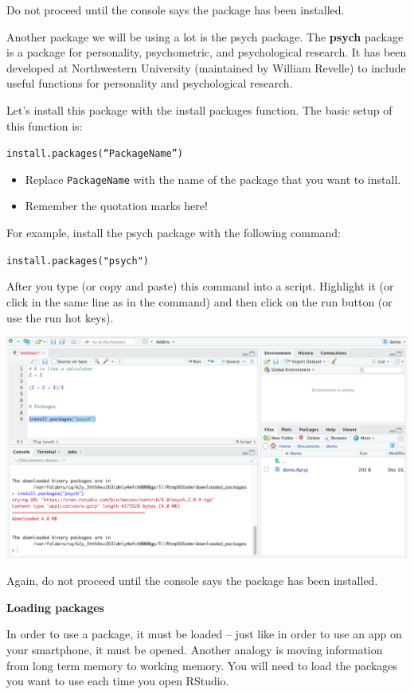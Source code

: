 \documentclass[
]{book}
\providecommand{\tightlist}{%
  \setlength{\itemsep}{0pt}\setlength{\parskip}{0pt}}
\begin{document}
Do not proceed until the console says the package has been installed.

Another package we will be using a lot is the psych package. The \textbf{psych} package is a package for personality, psychometric, and psychological research. It has been developed at Northwestern University (maintained by William Revelle) to include useful functions for personality and psychological research.

Let's install this package with the install packages function. The basic setup of this function is:

\texttt{install.packages(“PackageName”)}

\begin{itemize}
\tightlist
\item
  Replace \texttt{PackageName} with the name of the package that you want to install.\\
\item
  Remember the quotation marks here!
\end{itemize}

For example, install the psych package with the following command:

\texttt{install.packages("psych")}

After you type (or copy and paste) this command into a script. Highlight it (or click in the same line as in the command) and then click on the run button (or use the run hot keys).

\includegraphics{img/NAVIGATING AND COMMANDS R115.png}

Again, do not proceed until the console says the package has been installed.

\textbf{Loading packages}

In order to use a package, it must be loaded -- just like in order to use an app on your smartphone, it must be opened. Another analogy is moving information from long term memory to working memory. You will need to load the packages you want to use each time you open RStudio.
\end{document}
